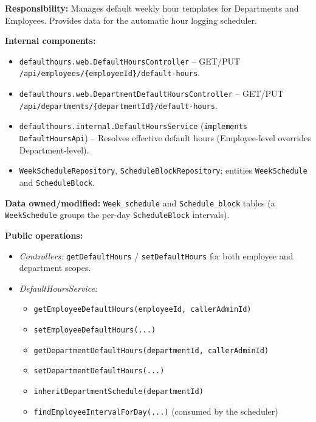 \documentclass[11pt,a4paper]{article}
\begin{document}
\textbf{Responsibility:} Manages default weekly hour templates for Departments and Employees. Provides data for the automatic hour logging scheduler.

\textbf{Internal components:}
\begin{itemize}[leftmargin=1.5em]
    \item \texttt{defaulthours.web.DefaultHoursController} -- GET/PUT \texttt{/api/\allowbreak employees/\allowbreak\{employeeId\}/\allowbreak default-hours}.
    \item \texttt{defaulthours.\allowbreak web.\allowbreak DepartmentDefaultHoursController} -- GET/PUT \texttt{/api/\allowbreak departments/\allowbreak\{departmentId\}/\allowbreak default-hours}.
    \item \texttt{defaulthours.internal.DefaultHoursService} (\texttt{implements DefaultHoursApi}) -- Resolves effective default hours (Employee-level overrides Department-level).
    \item \texttt{WeekScheduleRepository}, \texttt{ScheduleBlockRepository}; entities \texttt{WeekSchedule} and \texttt{ScheduleBlock}.
\end{itemize}

\textbf{Data owned/modified:} \texttt{Week\_schedule} and \texttt{Schedule\_block} tables (a \texttt{WeekSchedule} groups the per-day \texttt{ScheduleBlock} intervals).

\textbf{Public operations:}
\begin{itemize}[leftmargin=1.5em]
    \item \textit{Controllers:} \texttt{getDefaultHours} / \texttt{setDefaultHours} for both employee and department scopes.
    \item \textit{DefaultHoursService:}
    \begin{itemize}[noitemsep, leftmargin=1.5em]
        \item \texttt{getEmployeeDefaultHours(employeeId, callerAdminId)}
        \item \texttt{setEmployeeDefaultHours(...)}
        \item \texttt{getDepartmentDefaultHours(departmentId, callerAdminId)}
        \item \texttt{setDepartmentDefaultHours(...)}
        \item \texttt{inheritDepartmentSchedule(departmentId)}
        \item \texttt{findEmployeeIntervalForDay(...)} (consumed by the scheduler)
    \end{itemize}
\end{itemize}
\end{document}
